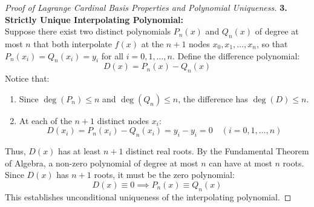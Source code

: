 \begin{proof}[Proof of Lagrange Cardinal Basis Properties and Polynomial Uniqueness]
\medskip
\noindent\textbf{3. Strictly Unique Interpolating Polynomial:} \\
Suppose there exist two distinct polynomials $P_n(x)$ and $Q_n(x)$ of degree at most $n$ that both interpolate $f(x)$ at the $n+1$ nodes $x_0, x_1, \dots, x_n$, so that $P_n(x_i) = Q_n(x_i) = y_i$ for all $i = 0, 1, \dots, n$.
Define the difference polynomial:
\begin{equation}
    D(x) = P_n(x) - Q_n(x)
\end{equation}
Notice that:
\begin{enumerate}
    \item Since $\deg(P_n) \le n$ and $\deg(Q_n) \le n$, the difference has $\deg(D) \le n$.
    \item At each of the $n+1$ distinct nodes $x_i$:
    \begin{equation}
        D(x_i) = P_n(x_i) - Q_n(x_i) = y_i - y_i = 0 \quad (i = 0, 1, \dots, n)
    \end{equation}
\end{enumerate}
Thus, $D(x)$ has at least $n+1$ distinct real roots. By the Fundamental Theorem of Algebra, a non-zero polynomial of degree at most $n$ can have at most $n$ roots. Since $D(x)$ has $n+1$ roots, it must be the zero polynomial:
\begin{equation}
    D(x) \equiv 0 \implies \boxed{P_n(x) \equiv Q_n(x)}
\end{equation}
This establishes unconditional uniqueness of the interpolating polynomial.
\end{proof}


